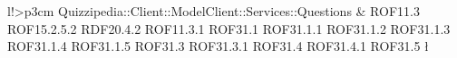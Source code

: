 \begin{tabella}{l!{\VRule}>{\centering\arraybackslash}p{3cm}}
Quizzipedia::Client::ModelClient::Services::Questions & ROF11.3 \linebreak ROF15.2.5.2 \linebreak RDF20.4.2 \linebreak ROF11.3.1 \linebreak ROF31.1 \linebreak ROF31.1.1 \linebreak ROF31.1.2 \linebreak ROF31.1.3 \linebreak ROF31.1.4 \linebreak ROF31.1.5 \linebreak ROF31.3 \linebreak ROF31.3.1 \linebreak ROF31.4 \linebreak ROF31.4.1 \linebreak ROF31.5 \l
\end{tabella}
